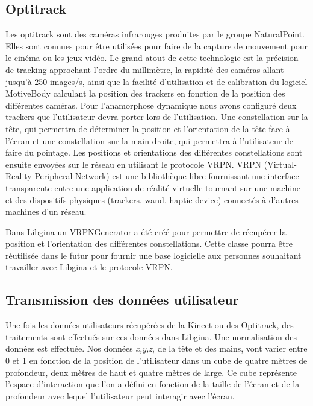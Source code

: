 \subsection{Optitrack}

Les optitrack sont des caméras infrarouges produites par le groupe NaturalPoint. Elles sont connues pour être utilisées pour faire de la capture de mouvement pour le cinéma ou les jeux vidéo. Le grand atout de cette technologie est la précision de tracking approchant l'ordre du millimètre, la rapidité des caméras allant jusqu'à 250 images/s, ainsi que la facilité d'utilisation et de calibration du logiciel MotiveBody calculant la position des trackers en fonction de la position des différentes caméras. 
Pour l'anamorphose dynamique nous avons configuré deux trackers que l'utilisateur devra porter lors de l'utilisation. Une constellation sur la tête, qui permettra de déterminer la position et l'orientation de la tête face à l'écran et une constellation sur la main droite, qui permettra à l'utilisateur de faire du pointage.
Les positions et orientations des différentes constellations sont ensuite envoyées sur le réseau en utilisant le protocole VRPN. VRPN (Virtual-Reality Peripheral Network) est une bibliothèque libre fournissant une interface transparente entre une application de réalité virtuelle tournant sur une machine et des dispositifs physiques (trackers, wand, haptic device) connectés à d'autres machines d'un réseau.

Dans Libgina un VRPNGenerator a été créé pour permettre de récupérer la position et l'orientation des différentes constellations. Cette classe pourra être réutilisée dans le futur pour fournir une base logicielle aux personnes souhaitant travailler avec Libgina et le protocole VRPN. 

\subsection{Transmission des données utilisateur}

Une fois les données utilisateurs récupérées de la Kinect ou des Optitrack, des traitements sont effectués sur ces données dans Libgina. Une normalisation des données est effectuée. Nos données \textit{x,y,z}, de la tête et des mains, vont varier entre 0 et 1 en fonction de la position de l'utilisateur dans un cube de quatre mètres de profondeur, deux mètres de haut et quatre mètres de large. Ce cube représente l'espace d'interaction que l'on a défini en fonction de la taille de l'écran et de la profondeur avec lequel l'utilisateur peut interagir avec l'écran.


